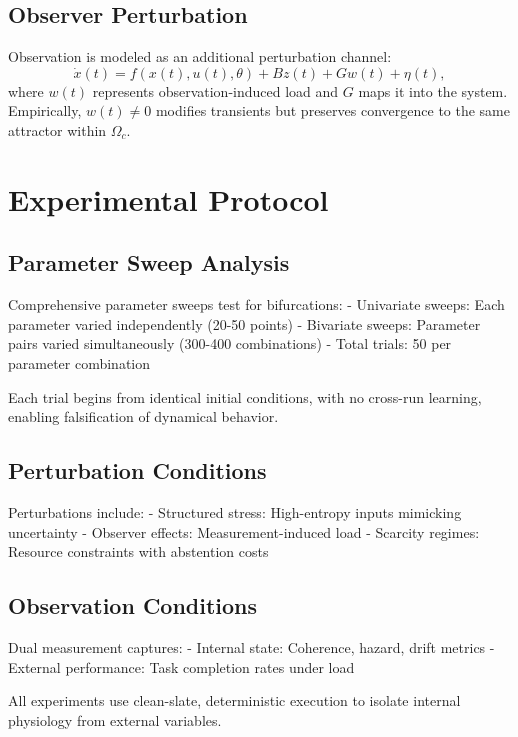 \documentclass[12pt,a4paper]{article}
\begin{document}
\subsection{Observer Perturbation}

Observation is modeled as an additional perturbation channel:
\begin{equation}
\dot{x}(t)= f(x(t),u(t),\theta) + B z(t) + G w(t) + \eta(t),
\end{equation}
where $w(t)$ represents observation-induced load and $G$ maps it into the system. Empirically, $w(t)\neq 0$ modifies transients but preserves convergence to the same attractor within $\Omega_c$.

\section{Experimental Protocol}

\subsection{Parameter Sweep Analysis}

Comprehensive parameter sweeps test for bifurcations:
- Univariate sweeps: Each parameter varied independently (20-50 points)
- Bivariate sweeps: Parameter pairs varied simultaneously (300-400 combinations)
- Total trials: 50 per parameter combination

Each trial begins from identical initial conditions, with no cross-run learning, enabling falsification of dynamical behavior.

\subsection{Perturbation Conditions}

Perturbations include:
- Structured stress: High-entropy inputs mimicking uncertainty
- Observer effects: Measurement-induced load
- Scarcity regimes: Resource constraints with abstention costs

\subsection{Observation Conditions}

Dual measurement captures:
- Internal state: Coherence, hazard, drift metrics
- External performance: Task completion rates under load

All experiments use clean-slate, deterministic execution to isolate internal physiology from external variables.
\end{document}
